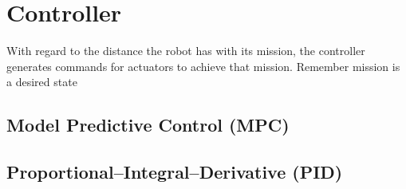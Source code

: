 \chapter{Controller}
    
    With regard to the distance the robot has with its mission, the controller generates commands for actuators to achieve that mission. Remember mission is a desired state
    
    
    \section{Model Predictive Control (MPC)}
    
    
    \section{Proportional–Integral–Derivative (PID)}